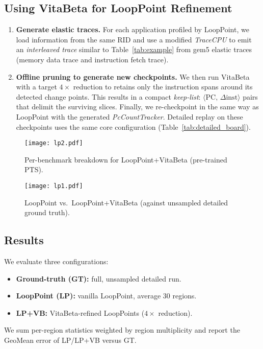 \documentclass[conference]{IEEEtran}
\begin{document}
\subsection{Using VitaBeta  for {LoopPoint Refinement}}
\begin{enumerate}[nosep, leftmargin=*]
\item \textbf{Generate elastic traces.}  
For each application profiled by LoopPoint, we load information from the same RID and use a modified \textit{TraceCPU} to  emit an \textit{interleaved trace} similar to Table~\ref{tab:example} from gem5 elastic traces\cite{elastic_trace_gem5} (memory data trace and instruction fetch trace).
\item \textbf{Offline pruning to generate new checkpoints.}  
    We then run VitaBeta with a target $4\times$ reduction to retains only the
      instruction spans around its detected change points. This results in a compact \emph{keep-list}:
      \(\langle\text{PC},\,\Delta\text{inst}\rangle\) pairs that delimit the surviving slices. Finally, we re-checkpoint in the same way as LoopPoint with the generated \textit{PcCountTracker}. Detailed replay on these checkpoints uses the same core configuration (Table~\ref{tab:detailed_board}).
\end{enumerate} 


\begin{figure*}[!htbp] 
    \centering
    \texttt{[image: lp2.pdf]}
    \caption{Per-benchmark breakdown for LoopPoint+VitaBeta (pre-trained PTS).}
    \label{fig:lp_vb_breakdown} 
\end{figure*}

\begin{figure}[!htbp] 
    \centering
    \texttt{[image: lp1.pdf]}
    \caption{LoopPoint vs.\ LoopPoint+VitaBeta (against unsampled detailed ground truth).}
    \label{fig:lp_vb_comparison} 
\end{figure}

\subsection{Results}
We evaluate three configurations:
\begin{itemize}[nosep, leftmargin=*]
    \item \textbf{Ground-truth (GT): }  full, unsampled detailed run.
    \item \textbf{LoopPoint (LP): }  vanilla LoopPoint, average 30 regions.
    \item \textbf{LP+VB: } VitaBeta-refined LoopPoints ($4\times$ reduction).
\end{itemize}
\smallskip\noindent
We sum per-region statistics weighted by region
multiplicity and report the GeoMean error of
\textsc{LP}/\textsc{LP+VB} versus \textsc{GT}.  
\end{document}
